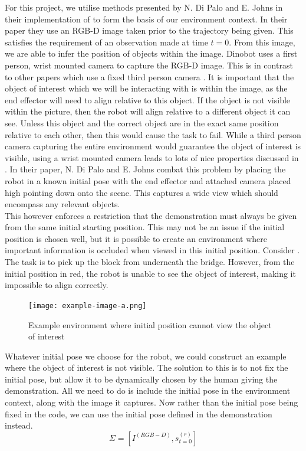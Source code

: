 For this project, we utilise methods presented by N. Di Palo and E. Johns in their implementation of  \cite{one-shot-imitation} to form the basis of our environment context. In their paper they use an RGB-D image taken prior to the trajectory being given. This satisfies the requirement of an observation made at time $t=0$. From this image, we are able to infer the position of objects within the image. Dinobot uses a first person, wrist mounted camera to capture the RGB-D image. This is in contrast to other papers which use a fixed third person camera \cite{one-shot-pose-estimate}.
It is important that the object of interest which we will be interacting with is within the image, as the end effector will need to align relative to this object. If the object is not visible within the picture, then the robot will align relative to a different object it can see. Unless this object and the correct object are in the exact same position relative to each other, then this would cause the task to fail. 
While a third person camera capturing the entire environment would guarantee the object of interest is visible, using a wrist mounted camera leads to lots of nice properties discussed in . In their paper, N. Di Palo and E. Johns combat this problem by placing the robot in a known initial pose with the end effector and attached camera placed high pointing down onto the scene. This captures a wide view which should encompass any relevant objects.\\

This however enforces a restriction that the demonstration must always be given from the same initial starting position. This may not be an issue if the initial position is chosen well, but it is possible to create an environment where important information is occluded when viewed in this initial position. Consider . The task is to pick up the block from underneath the bridge. However, from the initial position in red, the robot is unable to see the object of interest, making it impossible to align correctly.

\begin{figure}[h]
    \centering
    \texttt{[image: example-image-a.png]}
    \caption{Example environment where initial position cannot view the object of interest}
    \label{fig:occluded}
\end{figure}

Whatever initial pose we choose for the robot, we could construct an example where the object of interest is not visible. The solution to this is to not fix the initial pose, but allow it to be dynamically chosen by the human giving the demonstration. All we need to do is include the initial pose in the environment context, along with the image it captures. Now rather than the initial pose being fixed in the code, we can use the initial pose defined in the demonstration instead.
$$\Sigma = [I^{(RGB-D)}, s^{(r)}_{t=0}]$$


